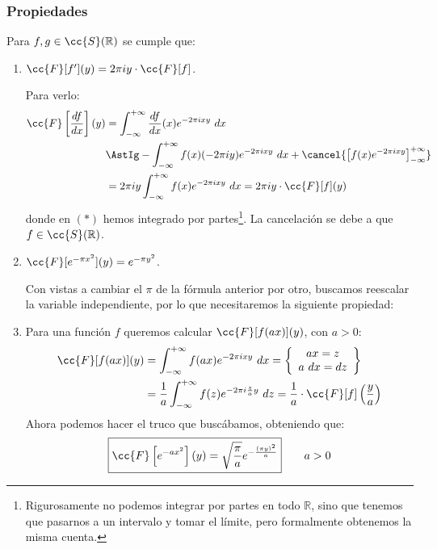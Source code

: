 \subsubsection{Propiedades}
\noindent
Para $f,g\in \cc{S}(\mathbb{R})$ se cumple que:
\begin{enumerate}
    \item $\cc{F}[f'](y) = 2\pi iy\cdot \cc{F}[f]$.

        Para verlo:
        \begin{align*}
            \cc{F}\left[\frac{df}{dx}\right](y) &= \int_{-\infty}^{+\infty} \frac{d f}{dx}(x)e^{-2\pi ixy}~dx \\ &\AstIg -\int_{-\infty}^{+\infty} f(x)(-2\pi iy)e^{-2\pi ixy}~dx + \cancel{\left[f(x)e^{-2\pi ixy}\right]_{-\infty}^{+\infty}} \\
                                                &= 2\pi iy \int_{-\infty}^{+\infty} f(x)e^{-2\pi ixy}~dx = 2\pi iy \cdot \cc{F}[f](y)
        \end{align*}
        donde en $(\ast)$ hemos integrado por partes\footnote{Rigurosamente no podemos integrar por partes en todo $\mathbb{R}$, sino que tenemos que pasarnos a un intervalo y tomar el límite, pero formalmente obtenemos la misma cuenta.}. La cancelación se debe a que $f\in \cc{S}(\mathbb{R})$.
    \item $\cc{F}[e^{-\pi x^2}](y) = e^{-\pi y^2}$.

        Con vistas a cambiar el $\pi$ de la fórmula anterior por otro, buscamos reescalar la variable independiente, por lo que necesitaremos la siguiente propiedad:
    \item Para una función $f$ queremos calcular $\cc{F}[f(ax)](y)$, con $a>0$:
        \begin{align*}
            \cc{F}[f(ax)](y) &= \int_{-\infty}^{+\infty} f(ax)e^{-2\pi ixy}~dx  = \left\{\begin{array}{cc}
                ax = z \\
                a~dx = dz 
        \end{array}\right\} \\
                             &= \frac{1}{a}\int_{-\infty}^{+\infty} f(z)e^{-2\pi i\frac{z}{a}y}~dz = \frac{1}{a}\cdot \cc{F}[f]\left(\frac{y}{a}\right)
        \end{align*}
        Ahora podemos hacer el truco que buscábamos, obteniendo que:
        \begin{equation*}
            \boxed{\cc{F}\left[e^{-ax^2}\right](y) = \sqrt{\frac{\pi}{a}} e^{-\frac{{(\pi y)}^{2}}{a}}} \qquad a>0
        \end{equation*}
\end{enumerate}


